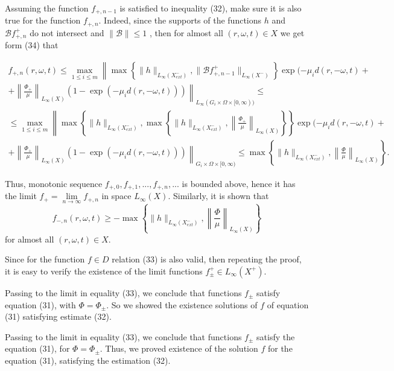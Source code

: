 \documentclass[12pt,reqno]{report}
\begin{document}
Assuming the function $f_{+, n-1}$ is satisfied to inequality (32), 
make sure it is also true for the function $f_{+, n}$.
Indeed, since the supports of the functions $h$ and ${\mathcal B} f^+_{+, n}$ do 
not intersect and  $\|{\mathcal B}\| \leq 1$ , then for almost all
$(r,\omega,t)\in X$ we get form (34) that

\begin{multline}
f_{+,n}(r,\omega,t) \leq \max \limits _{1\leq i \leq m} \left\|
\max \left\{\|h\|_{L_{\infty}(X^-_{ext})}, \|\mathcal B f^+_{+,n-1}\|_{L_{\infty}(X^-)}
\right\} \exp (- \mu_i d(r,-\omega,t) + \right.
\\
\left.
+ \left\|\frac{\Phi_+}{\mu} \right\|_{L_{\infty}(X)}
\left(1-\exp (- \mu_i d(r,-\omega,t)) \right) \right\|_{L_{\infty}(G_i \times
	\Omega \times [0,\infty))} \leq \\ \leq
\max \limits _{1\leq i \leq m} \left\|
\max \left\{\|h\|_{L_{\infty}(X^-_{ext})}, \max \left\{\|h\|_{L_{\infty}(X^-_{ext})},
\left\|\frac{\Phi_+}{\mu} \right\|_{L_{\infty}(X)} \right\} \right\} \exp (-
\mu_i d(r,-\omega,t) + \right.
\\
\left.
+ \left\|\frac{\Phi_+}{\mu} \right\|_{L_{\infty}(X)}
\left(1-\exp (- \mu_i d(r,-\omega,t)) \right) \right\|_{G_i \times
	\Omega \times [0,\infty)} \leq \max \left\{\|h\|_{L_{\infty}(X^-_{ext})},
\left\|\frac{\Phi}{\mu} \right\|_{L_{\infty}(X)} \right\}.
\end{multline}

Thus, monotonic sequence $f_{+,0},
f_{+,1},..., f_{+,n},...$ is bounded above, hence it has the limit $f_+=\lim \limits_{n \to \infty} f_{+,n}$ 
in space $L_{\infty} (X)$. Similarly, it is shown that
$$
f_{-,n}(r,\omega,t) \geq -\max \left\{\|h\|_{L_{\infty}(X^-_{ext})},
\left\|\frac{\Phi}{\mu} \right\|_{L_{\infty}(X )}\right\}
$$
for almost all $(r,\omega,t)\in X$.

Since for the function $f \in D$ relation (33) is also valid, then repeating the proof, it is easy to verify
the existence of the limit functions $f^+_{\pm} \in L_{\infty}(X^+)$.

Passing to the limit in equality (33), we conclude that
functions $ f _ {\pm} $ satisfy equation (31), with
$ \Phi = \Phi _ {\pm} $. So we showed the existence
solutions of $ f $ of equation (31) satisfying estimate (32).

Passing to the limit in equality (33), we conclude that
functions $f_{\pm}$ satisfy the equation (31), for
$\Phi=\Phi_{\pm}$. Thus, we proved existence of the solution $f$ for the equation (31), 
satisfying the estimation (32).
\end{document}
